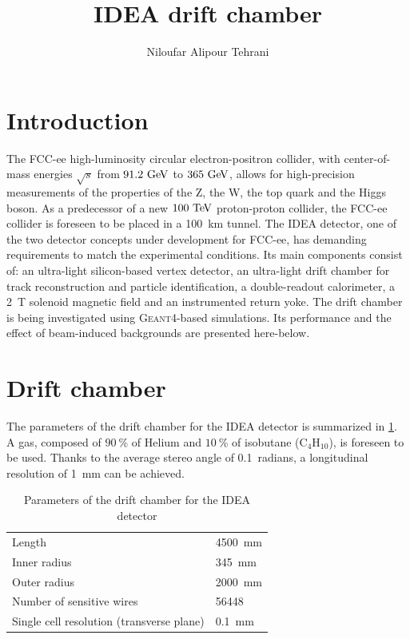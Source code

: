 \documentclass{article}
\begin{document}
\title{IDEA drift chamber}
\author{Niloufar Alipour Tehrani}

\maketitle

\section{Introduction}
The FCC-ee high-luminosity circular electron-positron collider, with center-of-mass energies $\sqrt{s}$ from $91.2\,\mathrm{\,Ge\kern -0.1em V}$ to
$365\,\mathrm{\,Ge\kern -0.1em V}$, allows for high-precision measurements of the properties of the Z, the W, the top quark and the Higgs boson. As a predecessor of a new $100\,\mathrm{\,Te\kern -0.1em V}$ proton-proton collider, the FCC-ee collider is foreseen to be placed in a 100~km tunnel. The IDEA detector, one of the two detector concepts under development for FCC-ee, has demanding requirements to match the experimental conditions. Its main components consist of: an ultra-light silicon-based vertex detector, an ultra-light drift chamber for track reconstruction and particle identification, a double-readout calorimeter, a 2~T solenoid magnetic field and an instrumented return yoke. The drift chamber is being investigated using \textsc{Geant4}-based simulations. Its performance and the effect of beam-induced backgrounds are presented here-below.


\section{Drift chamber}
The parameters of the drift chamber for the IDEA detector is summarized in \cref{driftChamberParams}. A gas, composed of $90~\%$ of Helium and $10~\%$ of isobutane ($\text{C}_{4}\text{H}_{10}$), is foreseen to be used. Thanks to the average stereo angle of 0.1~radians, a longitudinal resolution of 1~mm can be achieved.

\begin{table}[!h]
	\renewcommand{\arraystretch}{1.3}
	\caption{Parameters of the drift chamber for the IDEA detector}
	\label{driftChamberParams}
	\centering
	\begin{tabular}{l l}
		\toprule
		Length & 4500~mm \\
        Inner radius & 345~mm \\
        Outer radius & 2000~mm\\
        Number of sensitive wires & 56448 \\
        Single cell resolution (transverse plane) & 0.1~mm \\
		\bottomrule
	\end{tabular}
\end{table}
\end{document}
